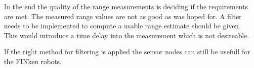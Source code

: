 In the end the quality of the range measurements is deciding if the requirements are met.
The measured range values are not as good as was hoped for.
A filter needs to be implemented to compute a usable range estimate should be given.
This would introduce a time delay into the measurement which is not desireable. 

If the right method for filtering is applied the sensor nodes can still be usefull for the FINken robots.
